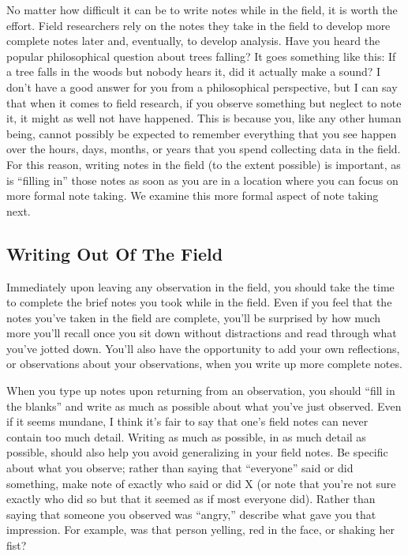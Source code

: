 No matter how difficult it can be to write notes while in the field, it is worth the effort. Field researchers rely on the notes they take in the field to develop more complete notes later and, eventually, to develop analysis. Have you heard the popular philosophical question about trees falling? It goes something like this: If a tree falls in the woods but nobody hears it, did it actually make a sound? I don’t have a good answer for you from a philosophical perspective, but I can say that when it comes to field research, if you observe something but neglect to note it, it might as well not have happened. This is because you, like any other human being, cannot possibly be expected to remember everything that you see happen over the hours, days, months, or years that you spend collecting data in the field. For this reason, writing notes in the field (to the extent possible) is important, as is “filling in” those notes as soon as you are in a location where you can focus on more formal note taking. We examine this more formal aspect of note taking next.

\subsection{Writing Out Of The Field}

Immediately upon leaving any observation in the field, you should take the time to complete the brief notes you took while in the field. Even if you feel that the notes you’ve taken in the field are complete, you’ll be surprised by how much more you’ll recall once you sit down without distractions and read through what you’ve jotted down. You’ll also have the opportunity to add your own reflections, or observations about your observations, when you write up more complete notes.

When you type up notes upon returning from an observation, you should “fill in the blanks” and write as much as possible about what you’ve just observed. Even if it seems mundane, I think it’s fair to say that one’s field notes can never contain too much detail. Writing as much as possible, in as much detail as possible, should also help you avoid generalizing in your field notes. Be specific about what you observe; rather than saying that “everyone” said or did something, make note of exactly who said or did X (or note that you’re not sure exactly who did so but that it seemed as if most everyone did). Rather than saying that someone you observed was “angry,” describe what gave you that impression. For example, was that person yelling, red in the face, or shaking her fist?

